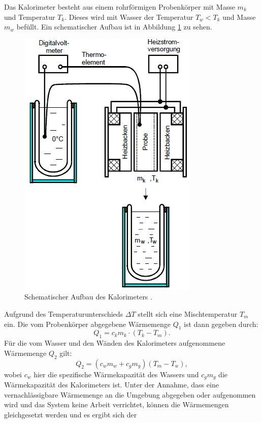 Das Kalorimeter besteht aus einem rohrförmigen Probenkörper mit Masse $m_k$ und Temperatur $T_k$.
Dieses wird mit Wasser der Temperatur $T_w < T_k$  und Masse $m_w$ befüllt.
Ein schematischer Aufbau ist in Abbildung \ref{fig:kalorimeter} zu sehen.
\begin{figure}[H]
  \centering
  \includegraphics[scale=0.65]{Text/Bilder/Kalorimeter.png}
  \caption{Schematischer Aufbau des Kalorimeters \cite[158]{sample1}.}
  \label{fig:kalorimeter}
\end{figure}
Aufgrund des Temperaturunterschieds $\Delta T$ stellt sich eine Mischtemperatur $T_m$ ein.
Die vom Probenkörper abgegebene Wärmemenge $Q_1$ ist dann gegeben durch:
\begin{equation}
  Q_1=c_k m_k \cdot \left( T_k-T_m \right ).
\end{equation}
Für die vom Wasser und den Wänden des Kalorimeters aufgenommene Wärmemenge $Q_2$ gilt:
\begin{equation}
  Q_2=\left (c_w m_w + c_g m_g \right ) (T_m-T_w) ,
\end{equation}
wobei $c_w$ hier die spezifische Wärmekapazität des Wassers und $c_g m_g$ die Wärmekapazität des Kalorimeters ist.
Unter der Annahme, dass eine vernachlässigbare Wärmemenge an die Umgebung abgegeben oder aufgenommen wird
und das System keine Arbeit verrichtet, können die Wärmemengen gleichgesetzt werden und es ergibt sich der
